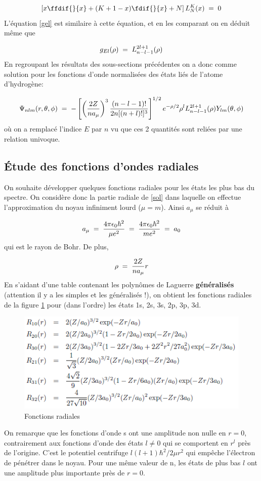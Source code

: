 \begin{equation}
    \left[x\ffdif{}{x}+(K+1-x)\fdif{}{x}+N\right] L_{N}^{K}(x)\eq 0
\end{equation}
L'équation \eqref{gel} est similaire à cette équation, et en les comparant on en déduit même que

\[
    g_{El}(\rho)\; = \; L_{n-l-1}^{2l+1}(\rho)
\]
En regroupant les résultats des sous-sections précédentes on a donc comme solution pour les fonctions d'onde normalisées des états liés de l'atome d'hydrogène:

\begin{equation}
    \Psi_{nlm}(r,\theta,\phi)\; = \; -\left[\left(\dfrac{2Z}{na_{\mu}}\right)^3\dfrac{(n-l-1)!}{2n[(n+l)!]^3}\right]^{1/2}e^{-\rho/2}\rho^l L_{n-l-1}^{2l+1}(\rho)Y_{lm}(\theta,\phi)
    \label{sol}
\end{equation}
où on a remplacé l'indice $E$ par $n$ vu que ces 2 quantités sont reliées par une relation univoque.


\subsection{Étude des fonctions d'ondes radiales}
On souhaite développer quelques fonctions radiales pour les états les plus bas du spectre. On considère donc la partie radiale de \eqref{sol} dans laquelle on effectue l'approximation du noyau infiniment lourd ($\mu=m$). Ainsi $a_\mu$ se réduit à

\[
    a_{\mu}\; = \; \dfrac{4\pi\epsilon_0\hbar^2}{\mu e^2}\; = \; \dfrac{4\pi\epsilon_0\hbar^2}{me^2}\; = \;  a_0
\]
qui est le rayon de Bohr. De plus,

\[
    \rho\; = \; \dfrac{2Z}{n a_{\mu}}r
\]
En s'aidant d'une table contenant les polynômes de Laguerre \textbf{généralisés} (attention il y a les simples et les généralisés !), on obtient les fonctions radiales de la figure \ref{fig:foncrad} pour (dans l'ordre) les états 1s, 2s, 3s, 2p, 3p, 3d.

\begin{figure}[htp]
    \centering
    \includegraphics{Images2/foncrad.PNG}
    \caption{Fonctions radiales}
    \label{fig:foncrad}
\end{figure}
On remarque que les fonctions d'onde s ont une amplitude non nulle en $r = 0$, contrairement aux fonctions
d'onde des états $l\neq 0$ qui se comportent en $r^l$ près de l'origine. C'est le potentiel centrifuge $l(l+1)\hbar^2/2\mu r^2$ qui empêche l'électron de pénétrer dans le noyau. Pour une même valeur de n, les états de plus bas $l$ ont une amplitude plus importante près de $r = 0$.

